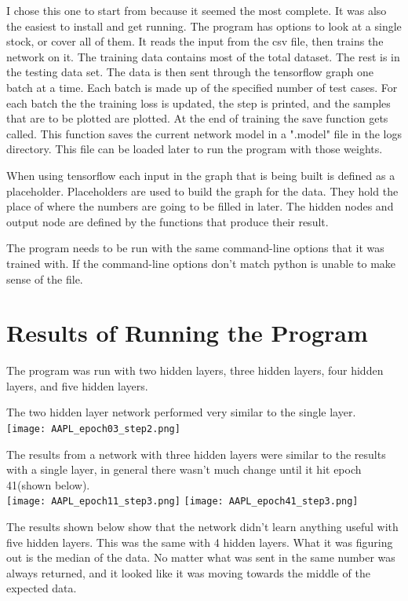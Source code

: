 \documentclass{article}
\begin{document}
I chose this one to start from because it seemed the most complete.
It was also the easiest to install and get running.
The program has options to look at a single stock, or cover all of them.
It reads the input from the csv file, then trains the network on it. 
The training data contains most of the total dataset.
The rest is in the testing data set.
The data is then sent through the tensorflow graph one batch at a time. 
Each batch is made up of the specified number of test cases. 
For each batch the the training loss is updated, the step is printed, and the samples that are to be plotted are plotted.
At the end of training the save function gets called.
This function saves the current network model in a ".model" file in the logs directory.
This file can be loaded later to run the program with those weights.

When using tensorflow each input in the graph that is being built is defined as a placeholder.
Placeholders are used to build the graph for the data.
They hold the place of where the numbers are going to be filled in later.
The hidden nodes and output node are defined by the functions that produce their result.

The program needs to be run with the same command-line options that it was trained with.
If the command-line options don't match python is unable to make sense of the file.

\section{Results of Running the Program}
The program was run with two hidden layers, three hidden layers, four hidden layers, and five hidden layers.

The two hidden layer network performed very similar to the single layer.\\
\texttt{[image: AAPL\_epoch03\_step2.png]}

The results from a network with three hidden layers were similar to the results with a single layer, in general there wasn't much change until it hit epoch 41(shown below). \\


\texttt{[image: AAPL\_epoch11\_step3.png]}
\texttt{[image: AAPL\_epoch41\_step3.png]}


The results shown below show that the network didn't learn anything useful with five hidden layers. 
This was the same with 4 hidden layers.
What it was figuring out is the median of the data.
No matter what was sent in the same number was always returned, and it looked like it was moving towards the middle of the expected data. \\
\end{document}
